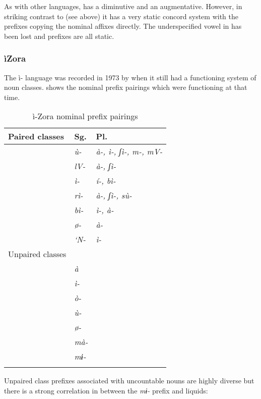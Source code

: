 \documentclass[output=paper]{langsci/langscibook}
\begin{document}
As with other  languages,  has a diminutive and an augmentative. However, in striking contrast to  (see above) it has a very static concord system with the prefixes copying the nominal affixes directly. The underspecified vowel in  has been lost and  prefixes are all static. 


\subsubsection{ìZora} \label{sec:kainji:3.5.4}%

The ì- language was recorded in 1973 by \citeauthor{Shimizu1979} when it still had a functioning system of noun classes.  shows the nominal prefix pairings which were functioning at that time.


\begin{table}
\caption{\label{tab:kainji:17} ì-Zora nominal prefix pairings}
\begin{tabularx}{\textwidth}{XXl}
\lsptoprule 
 {Paired classes}	& {Sg.}	& {Pl.}\\
\midrule
	& \textit{ù-}	& \textit{à-, ì-, ʃì-, m-, mV-}\\
	& \textit{lV-}	& \textit{à-, ʃì-}\\
	& \textit{ì-}	& \textit{í-, bì-}\\
	& \textit{rì-}	& \textit{à-, ʃì-, sù-}\\
	& \textit{bì-}	& \textit{ì-, à-}\\
	& \textit{ø-}	& \textit{à-}\\
	& \textit{`{N}-}	& \textit{ì-}\\ 
 {Unpaired classes}	\\
\midrule
	& \textit{à}	& \\
	& \textit{ì-}	& \\
	& \textit{ò-}	& \\
	& \textit{ù-}	& \\
	& \textit{ø-}	& \\
	& \textit{mà-}	& \\
	& \textit{mɨ-}	& \\
\lspbottomrule
\end{tabularx}
\end{table}

\newpage 
Unpaired class prefixes associated with uncountable nouns are highly diverse but there is a strong correlation in  between the \textit{mɨ-} prefix and liquids:
\end{document}
